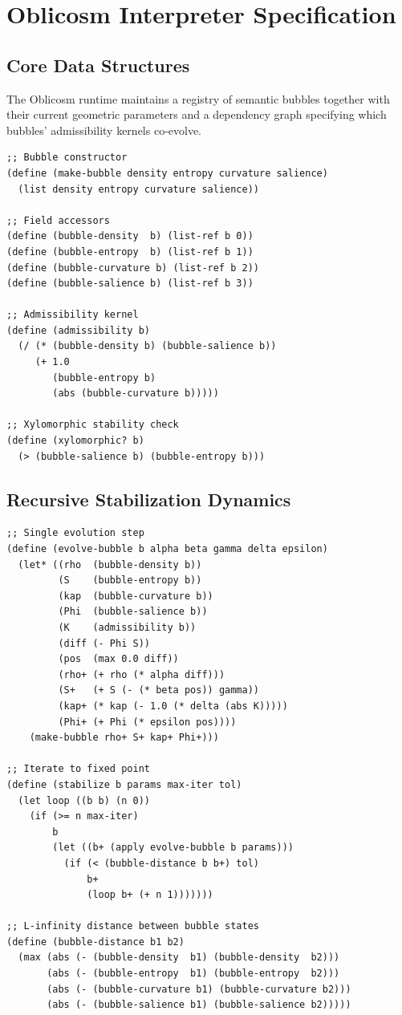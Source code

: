 \documentclass[12pt,oneside]{book}
\theoremstyle{plain}
\theoremstyle{definition}
\theoremstyle{plain}
\begin{document}
\chapter{Oblicosm Interpreter Specification}
\label{app:oblicosm}

\section{Core Data Structures}

The Oblicosm runtime maintains a registry of semantic bubbles together with their current geometric parameters and a dependency graph specifying which bubbles' admissibility kernels co-evolve.

\begin{lstlisting}
;; Bubble constructor
(define (make-bubble density entropy curvature salience)
  (list density entropy curvature salience))

;; Field accessors
(define (bubble-density  b) (list-ref b 0))
(define (bubble-entropy  b) (list-ref b 1))
(define (bubble-curvature b) (list-ref b 2))
(define (bubble-salience b) (list-ref b 3))

;; Admissibility kernel
(define (admissibility b)
  (/ (* (bubble-density b) (bubble-salience b))
     (+ 1.0
        (bubble-entropy b)
        (abs (bubble-curvature b)))))

;; Xylomorphic stability check
(define (xylomorphic? b)
  (> (bubble-salience b) (bubble-entropy b)))
\end{lstlisting}

\section{Recursive Stabilization Dynamics}

\begin{lstlisting}
;; Single evolution step
(define (evolve-bubble b alpha beta gamma delta epsilon)
  (let* ((rho  (bubble-density b))
         (S    (bubble-entropy b))
         (kap  (bubble-curvature b))
         (Phi  (bubble-salience b))
         (K    (admissibility b))
         (diff (- Phi S))
         (pos  (max 0.0 diff))
         (rho+ (+ rho (* alpha diff)))
         (S+   (+ S (- (* beta pos)) gamma))
         (kap+ (* kap (- 1.0 (* delta (abs K)))))
         (Phi+ (+ Phi (* epsilon pos))))
    (make-bubble rho+ S+ kap+ Phi+)))

;; Iterate to fixed point
(define (stabilize b params max-iter tol)
  (let loop ((b b) (n 0))
    (if (>= n max-iter)
        b
        (let ((b+ (apply evolve-bubble b params)))
          (if (< (bubble-distance b b+) tol)
              b+
              (loop b+ (+ n 1)))))))

;; L-infinity distance between bubble states
(define (bubble-distance b1 b2)
  (max (abs (- (bubble-density  b1) (bubble-density  b2)))
       (abs (- (bubble-entropy  b1) (bubble-entropy  b2)))
       (abs (- (bubble-curvature b1) (bubble-curvature b2)))
       (abs (- (bubble-salience b1) (bubble-salience b2)))))
\end{lstlisting}
\end{document}
